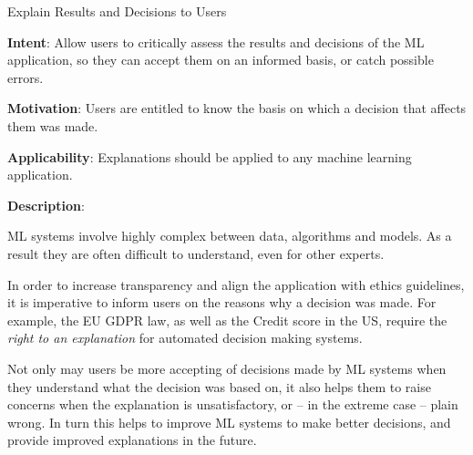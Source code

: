   
  \begin{frame}[plain]{ Explain Results and Decisions to Users
 }

  \textbf{Intent}: Allow users to critically assess the results and decisions of the ML application, so they can accept them on an informed basis, or catch possible errors.
 

  \textbf{Motivation}: Users are entitled to know the basis on which a decision that affects them was made. 
 

  \textbf{Applicability}: Explanations should be applied to any machine learning application.
 

  \textbf{Description}: 

ML systems involve highly complex between data, algorithms and models. As a result they are often difficult to understand, even for other experts.


In order to increase transparency and align the application with ethics guidelines, it is imperative to inform users on the reasons why a decision was made.
For example, the EU GDPR law, as well as the Credit score in the US, require the \emph{right to an explanation} for automated decision making systems.


Not only may users be more accepting of decisions made by ML systems when they understand what the decision was based on, it also helps them to raise concerns when the explanation is unsatisfactory, or -- in the extreme case -- plain wrong. In turn this helps to improve ML systems to make better decisions, and provide improved explanations in the future.


 


  \end{frame}

